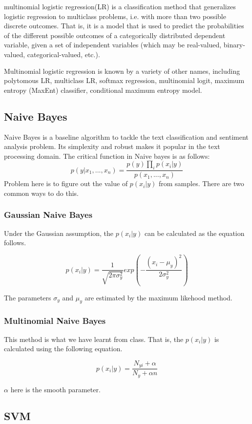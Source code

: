 \documentclass[letterpaper]{article} %
\begin{document}
multinomial logistic regression(LR) is a classification method that generalizes logistic regression to multiclass problems, i.e. with more than two possible discrete outcomes. That is, it is a model that is used to predict the probabilities of the different possible outcomes of a categorically distributed dependent variable, given a set of independent variables (which may be real-valued, binary-valued, categorical-valued, etc.).

Multinomial logistic regression is known by a variety of other names, including polytomous LR, multiclass LR, softmax regression, multinomial logit, maximum entropy (MaxEnt) classifier, conditional maximum entropy model.

\subsection{Naive Bayes}

Naive Bayes is a baseline algorithm to tackle the text classification and sentiment analysis problem. Its simplexity and robust makes it popular in the text processing domain. The critical function in Naive bayes is as follows: \cite{pedregosa2011scikit}
$$p(y|x_1,...,x_n) = \frac{p(y)\prod_i p(x_i|y)}{p(x_1,...,x_n)}$$
Problem here is to figure out the value of $p(x_i|y)$ from samples. There are two common ways to do this.
\subsubsection{Gaussian Naive Bayes}

Under the Gaussian assumption, the $p(x_i|y)$ can be calculated as the equation follows.

$$p(x_i|y) = \frac{1}{\sqrt{2\pi \sigma_y^2}}exp(-\frac{(x_i-\mu_y)^2}{2\sigma_y^2})$$

The parameters $\sigma_y$ and $\mu_y$ are estimated by the maximum likehood method.

\subsubsection{Multinomial Naive Bayes}

This method is what we have learnt from class. That is, the $p(x_i|y)$ is calculated using the following equation.

$$p(x_i|y)=\frac{N_{yi}+\alpha}{N_y+\alpha n}$$

$\alpha$ here is the smooth parameter.

\subsection{SVM}
\end{document}
